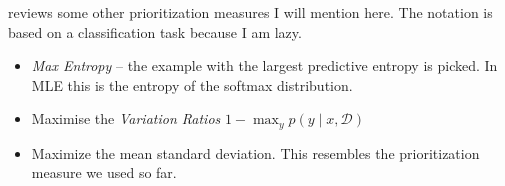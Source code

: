 \documentclass[10pt,a4paper]{article} %
\newcommand{\data}{\ensuremath{\mathcal{D}}}
\begin{document}
\cite{Gal2017DeepBA} reviews some other prioritization measures I will mention
here. The notation is based on a classification task because I am lazy.

\begin{itemize}
   \item \textit{Max Entropy} -- the example with the largest predictive 
   entropy is picked. In MLE this is the entropy of the softmax distribution.
   \item Maximise the \textit{Variation Ratios} $1 - \max_{y} p(y \mid x, \data)$
   \item Maximize the mean standard deviation. This resembles the prioritization
   measure we used so far.
\end{itemize}




\clearpage
\nocite{*}
\printbibliography
{}
\end{document}
